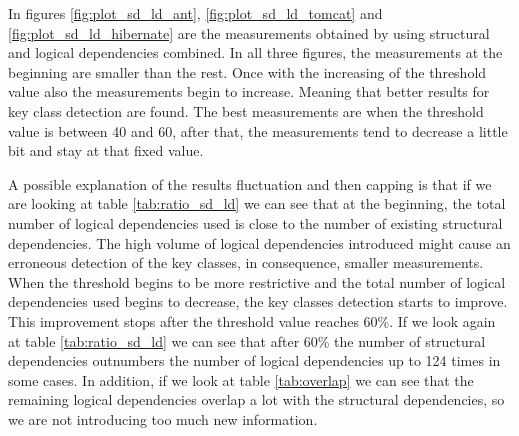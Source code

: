 \documentclass[12pt]{mitthesis}
\begin{document}
\begin{table}[!h]
\renewcommand{\arraystretch}{1}
\caption{Ratio between structural and logical dependencies (SD/LD)}
\label{tab:ratio_sd_ld}
\centering
{}
\end{table}

In figures \ref{fig:plot_sd_ld_ant}, \ref{fig:plot_sd_ld_tomcat} and \ref{fig:plot_sd_ld_hibernate} are the measurements obtained by using structural and logical dependencies combined. 
In all three figures, the measurements at the beginning are smaller than the rest. Once with the increasing of the threshold value also the measurements begin to increase. Meaning that better results for key class detection are found. 
The best measurements are when the threshold value is between 40 and 60, after that, the measurements tend to decrease a little bit and stay at that fixed value. 

A possible explanation of the results fluctuation and then capping is that if we are looking at table \ref{tab:ratio_sd_ld} we can see that at the beginning, the total number of logical dependencies used is close to the number of existing structural dependencies. The high volume of logical dependencies introduced might cause an erroneous detection of the key classes, in consequence, smaller measurements. 
When the threshold begins to be more restrictive and the total number of logical dependencies used begins to decrease, the key classes detection starts to improve. This improvement stops after the threshold value reaches 60\%. If we look again at table \ref{tab:ratio_sd_ld} we can see that after 60\% the number of structural dependencies outnumbers the number of logical dependencies up to 124 times in some cases. In addition, if we look at table \ref{tab:overlap} we can see that the remaining logical dependencies overlap a lot with the structural dependencies, so we are not introducing too much new information.
\end{document}
